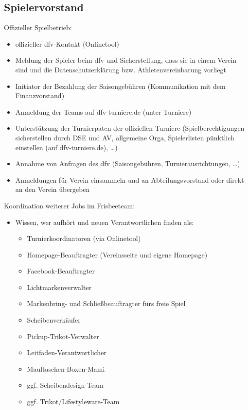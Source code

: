 \documentclass[a4 paper, 11pt]{article}
\begin{document}
\subsection{Spielervorstand}
Offizieller Spielbetrieb:
\begin{itemize}
	\item offizieller dfv-Kontakt (Onlinetool)
	\item Meldung der Spieler beim dfv und Sicherstellung, dass sie in einem Verein sind und
	die Datenschutzerklärung bzw. Athletenvereinbarung vorliegt
	\item Initiator der Bezahlung der Saisongebühren (Kommunikation mit dem Finanzvorstand)
	\item Anmeldung der Teams auf dfv-turniere.de (unter Turniere)
	\item Unterstützung der Turnierpaten der offiziellen Turniere (Spielberechtigungen sicherstellen
	durch DSE und AV, allgemeine Orga, Spielerlisten pünktlich einstellen (auf dfv-turniere.de), \dots)
	\item Annahme von Anfragen des dfv (Saisongebühren, Turnierausrichtungen, \dots)
	\item Anmeldungen für Verein einsammeln und an Abteilungsvorstand oder direkt an den Verein übergeben
\end{itemize}
\vspace{0.3cm}
Koordination weiterer Jobs im Frisbeeteam:
\begin{itemize}
	\item Wissen, wer aufhört und neuen Verantwortlichen finden als:
	\begin{itemize}
		\item Turnierkoordinatoren (via Onlinetool)
		\item Homepage-Beauftragter (Vereinsseite und eigene Homepage)
		\item Facebook-Beauftragter
		\item Lichtmarkenverwalter
		\item Markenbring- und Schließbeauftragter fürs freie Spiel
		\item Scheibenverkäufer
		\item Pickup-Trikot-Verwalter
		\item Leitfaden-Verantwortlicher
		\item Maultaschen-Boxen-Mami
		\item ggf. Scheibendesign-Team
		\item ggf. Trikot/Lifestyleware-Team
	\end{itemize}
\end{itemize}
\end{document}

